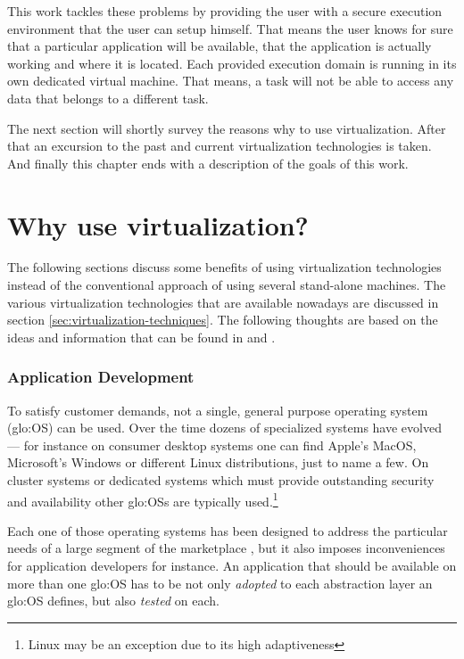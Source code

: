 This  work tackles  these problems  by providing  the user  with  a secure
execution environment that the user can setup himself. That means the user
knows for sure  that a particular application will  be available, that the
application is  actually working and  where it is located.   Each provided
execution domain  is running  in its own  dedicated virtual  machine. That
means,  a task  will not  be able  to access  any data  that belongs  to a
different task.

The   next  section   will  shortly   survey  the   reasons  why   to  use
virtualization.   After  that  an   excursion  to  the  past  and  current
virtualization technologies is taken. And finally this chapter ends with a
description of the goals of this work.

\section{Why use virtualization?}
\label{sec:benefits}

The  following  sections discuss  some  benefits  of using  virtualization
technologies  instead  of  the  conventional  approach  of  using  several
stand-alone  machines. The  various virtualization  technologies  that are
available       nowadays        are       discussed       in       section
\ref{sec:virtualization-techniques}.  The following  thoughts are based on
the  ideas  and information  that  can  be  found in  \cite{borden89}  and
\cite{virtualization-overview}.

\subsubsection{Application Development}

To  satisfy customer  demands,  not a  single,  general purpose  operating
system (\gls{glo:OS})  can be  used. Over the  time dozens  of specialized
systems have evolved --- for  instance on consumer desktop systems one can
find Apple's MacOS, Microsoft's  Windows or different Linux distributions,
just to  name a few.  On  cluster systems or dedicated  systems which must
provide  outstanding  security and  availability  other \gls{glo:OS}s  are
typically  used.\footnote{Linux  may  be  an  exception due  to  its  high
  adaptiveness}

Each  one of  those operating  systems has  been designed  to  address the
particular needs  of a large  segment of the  marketplace \cite{borden89},
but  it  also  imposes   inconveniences  for  application  developers  for
instance.   An application  that  should  be available  on  more than  one
\gls{glo:OS} has to  be not only \emph{adopted} to  each abstraction layer
an \gls{glo:OS} defines, but also \emph{tested} on each.

